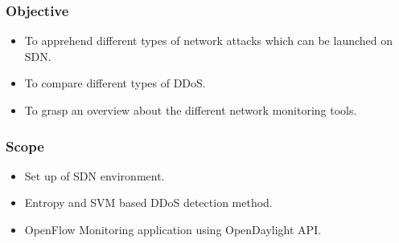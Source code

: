 \documentclass[10pt]{beamer}
\begin{document}
\begin{frame}
\frametitle{Objective}
\begin{center}
\begin{itemize}
\footnotesize
\item
To apprehend different types of network attacks which can be launched on SDN.
\item
To compare different types of DDoS.
\item
To grasp an overview about the different network monitoring tools.
\end{itemize}
\end{center}
\end{frame}

\begin{frame}
\frametitle{Scope}
\begin{center}
\begin{itemize}
\footnotesize
\item
Set up of SDN environment.
\item
Entropy and SVM based DDoS detection method.
\item
OpenFlow Monitoring application using OpenDaylight API.
\end{itemize}
\end{center}
\end{frame}








\end{document}
